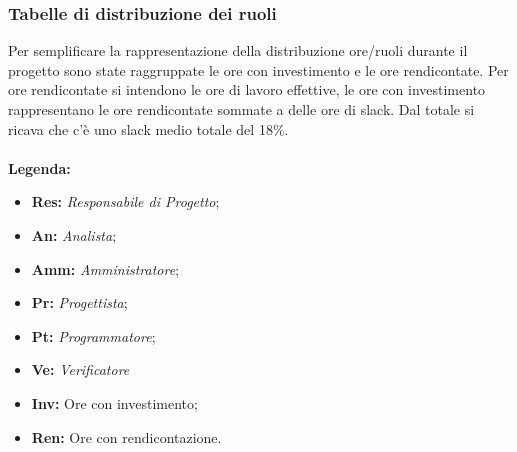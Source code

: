 \documentclass{scalatekids-article}
\begin{document}
\subsubsection{Tabelle di distribuzione dei ruoli}
Per semplificare la rappresentazione della distribuzione ore/ruoli durante il
progetto sono state raggruppate le ore con investimento e le ore rendicontate. Per ore rendicontate si intendono le ore di lavoro effettive, le ore con investimento rappresentano le ore rendicontate sommate a delle ore di slack. Dal totale si ricava che c'è uno slack medio totale del 18\%. \\ \\
\textbf{Legenda:}
\begin{itemize}
\item\textbf{Res:} \textit{Responsabile di Progetto};
\item\textbf{An:} \textit{Analista};
\item\textbf{Amm:} \textit{Amministratore};
\item\textbf{Pr:} \textit{Progettista};
\item\textbf{Pt:} \textit{Programmatore};
\item\textbf{Ve:} \textit{Verificatore}
\item\textbf{Inv:} Ore con investimento;
\item\textbf{Ren:} Ore con rendicontazione.
\end{itemize}
\end{document}
